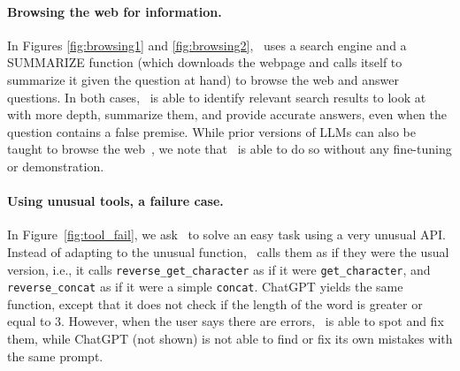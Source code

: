 \paragraph{Browsing the web for information.}
In Figures \ref{fig:browsing1} and \ref{fig:browsing2}, \DV\ uses a search engine and a SUMMARIZE function (which downloads the webpage and calls itself to summarize it given the question at hand) to browse the web and answer questions.
In both cases, \DV\  is able to identify relevant search results to look at with more depth, summarize them, and provide accurate answers, even when the question contains a false premise.
While prior versions of LLMs can also be taught to browse the web~\cite{nakano2021webgpt}, we note that \DV\ is able to do so without any fine-tuning or demonstration.

\paragraph{Using unusual tools, a failure case.}
In Figure~\ref{fig:tool_fail}, we ask \DV\ to solve an easy task using a very unusual API.
Instead of adapting to the unusual function, \DV\ calls them as if they were the usual version, i.e., it calls \texttt{reverse\_get\_character} as if it were \texttt{get\_character}, and \texttt{reverse\_concat} as if it were a simple \texttt{concat}. ChatGPT yields the same function, except that it does not check if the length of the word is greater or equal to $3$. However, when the user says there are errors, \DV\ is able to spot and fix them, while ChatGPT (not shown) is not able to find or fix its own mistakes with the same prompt.

